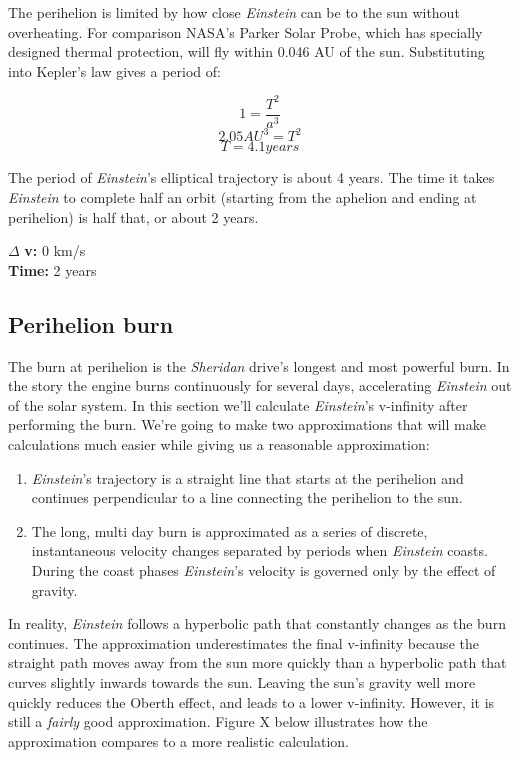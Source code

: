\documentclass[12pt]{article} %
\begin{document}
The perihelion is limited by how close \textit{Einstein} can be to the sun without overheating. For comparison NASA's Parker Solar Probe, which has specially designed thermal protection, will fly within 0.046 AU of the sun. Substituting into Kepler's law gives a period of:

$$1 = \frac{T^2}{a^3}$$
$$2.05AU^{3} = T^2$$
$$T = 4.1 years$$

The period of \textit{Einstein}'s elliptical trajectory is about 4 years. The time it takes \textit{Einstein} to complete half an orbit (starting from the aphelion and ending at perihelion) is half that, or about 2 years.

$\Delta$ \textbf{v:} 0 km/s\\
\textbf{Time:} 2 years

\subsection{Perihelion burn}
The burn at perihelion is the \textit{Sheridan} drive's longest and most powerful burn. In the story the engine burns continuously for several days, accelerating \textit{Einstein} out of the solar system. In this section we'll calculate \textit{Einstein}'s v-infinity after performing the burn. We're going to make two approximations that will make calculations much easier while giving us a reasonable approximation:

\begin{enumerate}
\item \textit{Einstein}'s trajectory is a straight line that starts at the perihelion and continues perpendicular to a line connecting the perihelion to the sun.
\item The long, multi day burn is approximated as a series of discrete, instantaneous velocity changes separated by periods when \textit{Einstein} coasts. During the coast phases \textit{Einstein}'s velocity is governed only by the effect of gravity.
\end{enumerate}

In reality, \textit{Einstein} follows a hyperbolic path that constantly changes as the burn continues. The approximation underestimates the final v-infinity because the straight path moves away from the sun more quickly than a hyperbolic path that curves slightly inwards towards the sun. Leaving the sun's gravity well more quickly reduces the Oberth effect, and leads to a lower v-infinity. However, it is still a \textit{fairly} good approximation. Figure X below illustrates how the approximation compares to a more realistic calculation.
\end{document}
